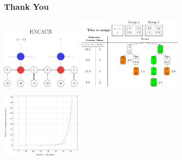 \documentclass{beamer}
\begin{document}
\begin{frame}
	\frametitle{Thank You} 
	\begin{center}
	\includegraphics[width=0.3\textwidth]{diagram}\hspace{2em}
	\includegraphics[width=0.4\textwidth]{tilePlacement/step10}
	\end{center}
	\begin{center}
	\includegraphics[width=0.3\textwidth]{plot}\hspace{2em}
	\resizebox{!}{.3\paperheight}{}
\end{center}
\end{frame}
\end{document}
